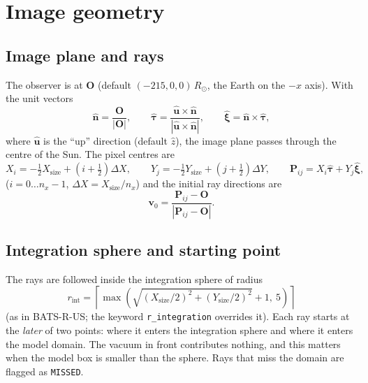 \documentclass[11pt,a4paper]{article}
\newcommand{\code}[1]{\texttt{#1}}
\newcommand{\vect}[1]{\bm{#1}}
\newcommand{\rsun}{R_\odot}
\begin{document}
\section{Image geometry}\label{sec:geometry}

\subsection{Image plane and rays}
The observer is at $\vect O$ (default $(-215,0,0)\,\rsun$, the Earth on the $-x$ axis). With the
unit vectors
\begin{equation}
  \hat{\vect n}=\frac{\vect O}{|\vect O|},\qquad
  \hat{\vect\tau}=\frac{\hat{\vect u}\times\hat{\vect n}}{|\hat{\vect u}\times\hat{\vect n}|},\qquad
  \hat{\vect\xi}=\hat{\vect n}\times\hat{\vect\tau},
\end{equation}
where $\hat{\vect u}$ is the ``up'' direction (default $\hat z$), the image plane passes through
the centre of the Sun. The pixel centres are
\begin{equation}
  X_i=-\tfrac12X_\text{size}+\left(i+\tfrac12\right)\Delta X,\qquad
  Y_j=-\tfrac12Y_\text{size}+\left(j+\tfrac12\right)\Delta Y,\qquad
  \vect P_{ij}=X_i\hat{\vect\tau}+Y_j\hat{\vect\xi},
\end{equation}
($i=0\ldots n_x-1$, $\Delta X=X_\text{size}/n_x$) and the initial ray directions are
\begin{equation}
  \vect v_0=\frac{\vect P_{ij}-\vect O}{|\vect P_{ij}-\vect O|}.
\end{equation}

\subsection{Integration sphere and starting point}
The rays are followed inside the integration sphere of radius
\begin{equation}
  r_\text{int}=\left\lceil\max\!\left(\sqrt{(X_\text{size}/2)^2+(Y_\text{size}/2)^2}+1,\ 5\right)\right\rceil
\end{equation}
(as in BATS-R-US; the keyword \code{r\_integration} overrides it). Each ray starts at the
\emph{later} of two points: where it enters the integration sphere and where it enters the model
domain. The vacuum in front contributes nothing, and this matters when the model box is smaller
than the sphere. Rays that miss the domain are flagged as \code{MISSED}.
\end{document}
